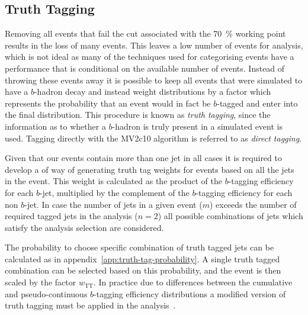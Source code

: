\subsection{Truth Tagging}
\label{subsec:truth-tagging}

Removing all events that fail the cut associated with the 70~\% working point
results in the loss of many events. This leaves a low number of events for
analysis, which is not ideal as many of the techniques used for categorising
events have a performance that is conditional on the available number of events.
Instead of throwing these events away it is possible to keep all events that
were simulated to have a $b$-hadron decay and instead weight distributions by a
factor which represents the probability that an event would in fact be
$b$-tagged and enter into the final distribution. This procedure is known as
\emph{truth tagging}, since the information as to whether a $b$-hadron is truly
present in a simulated event is used. Tagging directly with the MV2c10 algorithm
is referred to as \emph{direct tagging}.

Given that our events contain more than one jet in all cases it is required to
develop a of way of generating truth tag weights for events based on all the
jets in the event. This weight is calculated as the product of the $b$-tagging
efficiency for each $b$-jet, multiplied by the complement of the $b$-tagging
efficiency for each non $b$-jet. In case the number of jets in a given event
($m$) exceeds the number of required tagged jets in the analysis ($n=2$) all
possible combinations of jets which satisfy the analysis selection are
considered.

The probability to choose specific combination of truth tagged jets can be
calculated as in appendix~\ref{app:truth-tag-probability}. A single truth tagged
combination can be selected based on this probability, and the event is then
scaled by the factor $w_{\mathrm {TT}}$. In practice due to differences between
the cumulative and pseudo-continuous $b$-tagging efficiency distributions a
modified version of truth tagging must be applied in the
analysis~\cite{VHObjectNote2019}.


